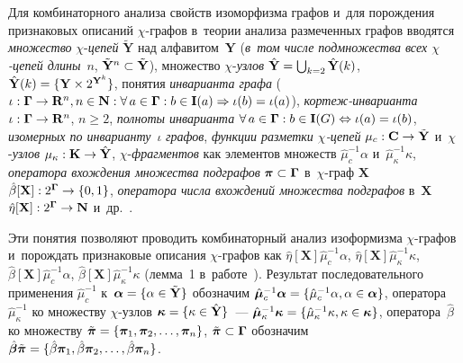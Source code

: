 \begin{multicols}{2}
     Для комбинаторного анализа свойств изоморфизма графов и~для 
порождения признаковых описаний $\chi$-гра\-фов в~тео\-рии анализа 
размеченных \mbox{графов} вводятся \textit{множество} $\chi$-\textit{це\-пей} 
$\tilde{\mathbf{Y}}$ над алфавитом~$\mathbf{Y}$ (\textit{в~том числе подмножества всех  
$\chi$-це\-пей длины}~$n$, $\tilde{\mathbf{Y}}^n \hm\subset \tilde{\mathbf{Y}}$), множество 
$\chi$-\textit{уз\-лов} $\hat{\mathbf{Y}}\hm= \bigcup_{k=2} \hat{\mathbf{Y}}(k)$, 
$\hat{\mathbf{Y}}(k)\hm= \{\mathbf{Y}\times 2^{\mathbf{Y}^k}\}$, понятия \textit{инварианта 
графа}  ($\iota: \boldsymbol{\Gamma}\hm\to \mathbf{R}^n, n\hm\in \mathbf{N}: 
\forall\,a \hm\in \boldsymbol{\Gamma}: b\hm\in \mathbf{I}(a)\hm\Rightarrow 
\iota (b)\hm= \iota(a)$), \textit{кор\-теж-ин\-ва\-ри\-ан\-та} $\iota: 
\boldsymbol{\Gamma}\hm\to \mathbf{R}^n$, $n\geq 2$, \textit{полноты 
инварианта} $\forall\,a\hm\in \boldsymbol{\Gamma}: b\hm\in \mathbf{I}(G) 
\hm\Leftrightarrow \iota(a) \hm= \iota(b)$, \textit{изомерных по 
инварианту}~$\iota$ \textit{графов}, \textit{функции разметки $\chi$-це\-пей}  
$\mu_c: \mathbf{C}\hm\to \tilde{\mathbf{Y}}$ и~$\chi$-\textit{узлов} 
$\mu_\kappa: \mathbf{K}\hm\to \hat{\mathbf{Y}}$,  
$\chi$-\textit{фраг\-мен\-тов} как элементов множеств $\hat{\mu}_c^{-1}\alpha$ 
и~$\hat{\mu}_\kappa^{-1}\kappa$, \textit{оператора вхождения множества 
подграфов} $\boldsymbol{\pi}\hm\subset \boldsymbol{\Gamma}$ в~$\chi$-граф 
$\mathbf{X}$ $\hat{\beta}[\mathbf{X}]: 2^{\boldsymbol{\Gamma}}\hm\to \{0,1\}$, 
\textit{оператора числа вхождений множества подграфов} в~$\mathbf{X}$ 
$\hat{\eta}[\mathbf{X}]: 2^{\boldsymbol{\Gamma}}\hm\to \mathbf{N}$ и~др.~\cite{8-tr}. 
     
     Эти понятия позволяют проводить комбинаторный анализ изоформизма 
$\chi$-гра\-фов и~порождать признаковые описания $\chi$-гра\-фов как 
$\hat{\eta}[\mathbf{X}]\hat{\mu}^{-1}_c \alpha$, 
$\hat{\eta}[\mathbf{X}]\hat{\mu}_\kappa^{-1}\kappa$, 
     $\hat{\beta}[\mathbf{X}]\hat{\mu}_c^{-1}\alpha$, 
$\hat{\beta}[\mathbf{X}]\hat{\mu}^{-1}_\kappa \kappa$ (лемма~1 
в~работе~\cite{9-tr}). Результат последовательного применения 
     $\hat{\mu}_c^{-1}$ к~$\boldsymbol{\alpha}\hm= \{\alpha \hm\in 
\tilde{\mathbf{Y}}\}$ обозначим $\hat{\boldsymbol{\mu}}_c^{-1}
\boldsymbol{\alpha} \hm= \{ \hat{\mu}_c^{-1}\alpha, \alpha\hm\in 
\boldsymbol{\alpha}\}$, оператора $\hat{\mu}_\kappa^{-1}$ ко множеству  
$\chi$-уз\-лов $\boldsymbol{\kappa}\hm= \{\kappa\hm\in \hat{\mathbf{Y}}\}$~---
$\hat{\boldsymbol{\mu}}_\kappa^{-1}\boldsymbol{\kappa}\hm= \{  
\hat{\mu}^{-1}_\kappa \kappa, \kappa\hm\in \boldsymbol{\kappa}\}$, 
оператора~$\hat{\beta}$ ко множеству $\tilde{\boldsymbol{\pi}}\hm= \{ 
\boldsymbol{\pi}_1, \boldsymbol{\pi}_2, \ldots , \boldsymbol{\pi}_n\}$, 
$\tilde{\boldsymbol{\pi}}\hm\subset \boldsymbol{\Gamma}$ обозначим 
$\hat{\boldsymbol{\beta}}\tilde{\boldsymbol{\pi}}\hm= \{ 
\hat{\beta}\boldsymbol{\pi}_1, \hat{\beta}\boldsymbol{\pi}_2, \ldots , 
\hat{\beta}\boldsymbol{\pi}_n\}$. 
     

\end{multicols}
